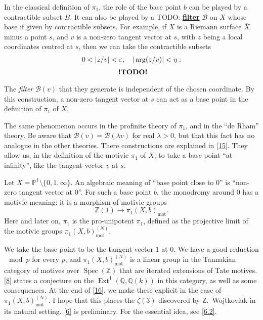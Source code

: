 \documentclass{article}
\theoremstyle{definition}
\newcommand{\mot}{\mathrm{mot}}
\newcommand{\bb}{\mathbb}
\newcommand{\PP}{\bb{P}}
\newcommand{\ZZ}{\bb{Z}}
\newcommand{\QQ}{\bb{Q}}
\DeclareMathOperator{\Ext}{Ext}
\DeclareMathOperator{\Spec}{Spec}
\newcommand{\unsure}[1]{TODO: \underline{\textbf{#1}}}
\newcommand{\todo}{\textbf{ !TODO! }}
\newcommand{\oldpage}[1]{\marginpar{\footnotesize$\Big\vert$ \textit{p.~#1}}}
\begin{document}
In the classical definition of $\pi_1$, the role of the base point $b$ can be played by a contractible subset $B$.
It can also be played by a \unsure{filter} $\mathcal{B}$ on $X$ whose base if given by contractible subsets.
For example, if $X$ is a Riemann surface $\overline{X}$ minus a point $s$, and $v$ is a non-zero tangent vector at $s$, with $z$ being a local coordinates centred at $s$, then we can take the contractible subsets
\[
  \begin{gathered}
    0<|z/v|<\varepsilon,
    \quad
    |\arg(z/v)|<\eta:
  \\\begin{tikzpicture}
      \node at (0,0) {\todo};
    \end{tikzpicture}
  \end{gathered}
\]
The \emph{filter} $\mathcal{B}(v)$ that they generate is independent of the chosen coordinate.
By this construction, a non-zero tangent vector at $s$ can act as a base point in the definition of $\pi_1$ of $X$.

The same phenomenon occurs in the profinite theory of $\pi_1$, and in the ``de Rham'' theory.
Be aware that $\mathcal{B}(v)=\mathcal{B}(\lambda v)$ for real $\lambda>0$, but that this fact has no analogue in the other theories.
There constructions are explained in \cref{15}.
They allow us,
\oldpage{86}
in the definition of the motivic $\pi_1$ of $X$, to take a base point ``at infinity'', like the tangent vector $v$ at $s$.

Let $X=\PP^1\setminus\{0,1,\infty\}$.
An algebraic meaning of ``base point close to $0$'' is ``non-zero tangent vector at $0$''.
For such a base point $b$, the monodromy around $0$ has a motivic meaning: it is a morphism of motivic groups
\[
  \ZZ(1) \to \pi_1(X,b)_\mot.
\]
Here and later on, $\pi_1$ is the pro-unipotent $\pi_1$, defined as the projective limit of the motivic groups $\pi_1(X,b)_\mot^{(N)}$.

We take the base point to be the tangent vector $1$ at $0$.
We have a good reduction $\mod p$ for every $p$, and $\pi_1(X,b)_\mot^{(N)}$ is a linear group in the Tannakian category of motives over $\Spec(\ZZ)$ that are iterated extensions of Tate motives.
\cref{8} states a conjecture on the $\Ext^1(\QQ,\QQ(k))$ in this category, as well as some consequences.
At the end of \cref{16}, we make these explicit in the case of $\pi_1(X,b)_\mot^{(N)}$.
I hope that this places the $\zeta(3)$ discovered by Z.~Wojtkoviak in its natural setting.
\cref{6} is preliminary.
For the essential idea, see \cref{6.2}.
\end{document}
